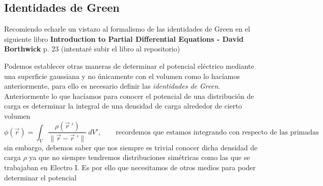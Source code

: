 \documentclass[11pt,a4paper]{article}
\begin{document}
\subsection{Identidades de Green}

Recomiendo echarle un vistazo al formalismo de las identidades de Green en el siguiente libro \textbf{Introduction to Partial Differential Equations - David Borthwick} p. 23 (intentaré subir el libro al repositorio)

Podemos establecer otras maneras de determinar el potencial eléctrico mediante una superficie gaussiana y no únicamente con el volumen como lo hacíamos anteriormente, para ello es necesario definir las \emph{identidades de Green}. Anteriormente lo que hacíamos para conocer el potencial de una distribución de carga es determinar la integral de una densidad de carga alrededor de cierto volumen
$$\phi(\vec{r})=\int_V\frac{\rho(\vec{r}\ ')}{\|\vec{r}-\vec{r}\ '\|}\ dV',\qquad\text{recordemos que estamos integrando con respecto de las primadas}$$
sin embargo, debemos saber que nos siempre es trivial conocer dicha densidad de carga $\rho$ ya que no siempre tendremos distribuciones simétricas como las que se trabajaban en Electro I. Es por ello que necesitamos de otros medios para poder determinar el potencial
\end{document}
